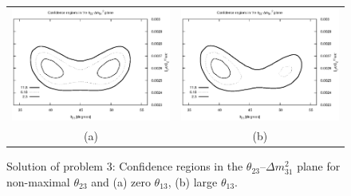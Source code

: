 \documentclass[12pt,a4paper]{article}
\newcommand{\ldm}{\ensuremath{{\Delta m_{31}^2}}}          %
\theoremstyle{dotless}
\begin{document}
\begin{figure}
  \hspace{-0.7 cm}
  \begin{tabular}{cc}
    \includegraphics[width=8cm]{T2K-3}  & 
    \includegraphics[width=8cm]{T2K-4} \\
           (a)                   &          (b)
  \end{tabular}
  \caption{Solution of problem 3: Confidence regions in the $\theta_{23}$--$\ldm$
  plane for non-maximal $\theta_{23}$ and (a) zero $\theta_{13}$,
  (b) large $\theta_{13}$.}
  \label{fig:th23dm31-nonmax}
\end{figure}
\end{document}
